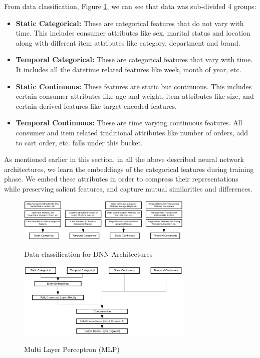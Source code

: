 From data classification, Figure \ref{fig:dnndata}, we can see that data was sub-divided 4 groups:
\begin{itemize}
\item {\bf Static Categorical:} These are categorical features that do not vary with time. This includes consumer
attributes like sex, marital status and location along with different item attributes like category, department and brand.
\item {\bf Temporal Categorical:} These are categorical features that vary with time. It includes all the datetime 
related features like week, month of year, etc.
\item {\bf Static Continuous:} These features are static but continuous. This includes certain consumer attributes like
age and weight, item attributes like size, and certain derived features like target encoded features.
\item {\bf Temporal Continuous:} These are time varying continuous features. All consumer and item related
traditional attributes like number of orders, add to cart order, etc. falls under this bucket.
\end{itemize}
As mentioned earlier in this section, in all the above described neural network architectures, we learn the embeddings \cite{guo2016entity} of the 
categorical features during training phase. We embed these attributes in order to compress their representations 
while preserving salient features, and capture mutual similarities and differences.
  \begin{figure}[t]
    \centering 
    \caption{Data classification for DNN Architectures} 
    \includegraphics[width=3.3in]{img/dnndata.png} 
    \label{fig:dnndata} 
  \end{figure}
  \begin{figure}[t]
    \centering 
    \caption{Multi Layer Perceptron (MLP)} 
    \includegraphics[width=3.3in]{img/MLP.png} 
    \label{fig:MLP} 
  \end{figure}
